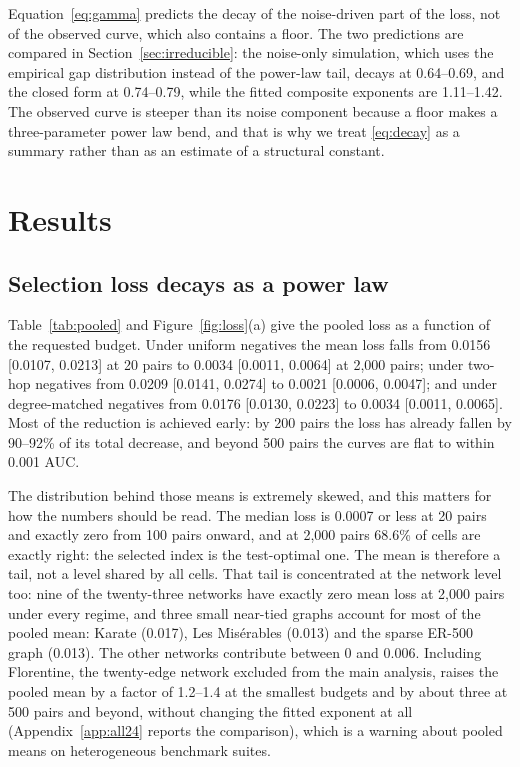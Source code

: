 \documentclass{comjnl}
\begin{document}
Equation~\eqref{eq:gamma} predicts the decay of the noise-driven part of the loss, not of the observed curve, which also contains a floor. The two predictions are compared in Section~\ref{sec:irreducible}: the noise-only simulation, which uses the empirical gap distribution instead of the power-law tail, decays at 0.64--0.69, and the closed form at 0.74--0.79, while the fitted composite exponents are 1.11--1.42. The observed curve is steeper than its noise component because a floor makes a three-parameter power law bend, and that is why we treat \eqref{eq:decay} as a summary rather than as an estimate of a structural constant.

\section{Results}
\label{sec:results}

\subsection{Selection loss decays as a power law}
\label{sec:decay}

Table~\ref{tab:pooled} and Figure~\ref{fig:loss}(a) give the pooled loss as a function of the requested budget. Under uniform negatives the mean loss falls from 0.0156 [0.0107, 0.0213] at 20 pairs to 0.0034 [0.0011, 0.0064] at 2{,}000 pairs; under two-hop negatives from 0.0209 [0.0141, 0.0274] to 0.0021 [0.0006, 0.0047]; and under degree-matched negatives from 0.0176 [0.0130, 0.0223] to 0.0034 [0.0011, 0.0065]. Most of the reduction is achieved early: by 200 pairs the loss has already fallen by 90--92\% of its total decrease, and beyond 500 pairs the curves are flat to within 0.001 AUC.

The distribution behind those means is extremely skewed, and this matters for how the numbers should be read. The median loss is 0.0007 or less at 20 pairs and exactly zero from 100 pairs onward, and at 2{,}000 pairs 68.6\% of cells are exactly right: the selected index is the test-optimal one. The mean is therefore a tail, not a level shared by all cells. That tail is concentrated at the network level too: nine of the twenty-three networks have exactly zero mean loss at 2{,}000 pairs under every regime, and three small near-tied graphs account for most of the pooled mean: Karate (0.017), Les Mis\'erables (0.013) and the sparse ER-500 graph (0.013). The other networks contribute between 0 and 0.006. Including Florentine, the twenty-edge network excluded from the main analysis, raises the pooled mean by a factor of 1.2--1.4 at the smallest budgets and by about three at 500 pairs and beyond, without changing the fitted exponent at all (Appendix~\ref{app:all24} reports the comparison), which is a warning about pooled means on heterogeneous benchmark suites.
\end{document}
